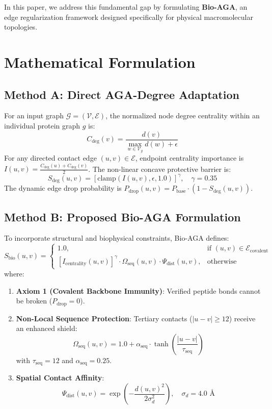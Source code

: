 \documentclass[10pt,journal,compsoc]{IEEEtran}
\begin{document}
In this paper, we address this fundamental gap by formulating \textbf{Bio-AGA}, an edge regularization framework designed specifically for physical macromolecular topologies.

\section{Mathematical Formulation}

\subsection{Method A: Direct AGA-Degree Adaptation}
For an input graph $\mathcal{G} = (\mathcal{V}, \mathcal{E})$, the normalized node degree centrality within an individual protein graph $g$ is:
\begin{equation}
C_{\text{deg}}(v) = \frac{d(v)}{\max_{w \in \mathcal{V}_g} d(w) + \epsilon}
\end{equation}
For any directed contact edge $(u, v) \in \mathcal{E}$, endpoint centrality importance is $I(u, v) = \frac{C_{\text{deg}}(u) + C_{\text{deg}}(v)}{2}$. The non-linear concave protective barrier is:
\begin{equation}
S_{\text{deg}}(u, v) = \left[ \text{clamp}(I(u, v), \epsilon, 1.0) \right]^\gamma, \quad \gamma = 0.35
\end{equation}
The dynamic edge drop probability is $P_{\text{drop}}(u, v) = P_{\text{base}} \cdot (1 - S_{\text{deg}}(u, v))$.

\subsection{Method B: Proposed Bio-AGA Formulation}
To incorporate structural and biophysical constraints, Bio-AGA defines:
\begin{equation}
S_{\text{bio}}(u, v) = \begin{cases}
1.0, & \text{if } (u, v) \in \mathcal{E}_{\text{covalent}} \\
\left[ I_{\text{centrality}}(u, v) \right]^\gamma \cdot \Omega_{\text{seq}}(u, v) \cdot \Psi_{\text{dist}}(u, v), & \text{otherwise}
\end{cases}
\end{equation}
where:
\begin{enumerate}
\item \textbf{Axiom 1 (Covalent Backbone Immunity)}: Verified peptide bonds cannot be broken ($P_{\text{drop}} = 0$).
\item \textbf{Non-Local Sequence Protection}: Tertiary contacts ($|u - v| \ge 12$) receive an enhanced shield:
\begin{equation}
\Omega_{\text{seq}}(u, v) = 1.0 + \alpha_{\text{seq}} \cdot \tanh\left(\frac{|u - v|}{\tau_{\text{seq}}}\right)
\end{equation}
with $\tau_{\text{seq}} = 12$ and $\alpha_{\text{seq}} = 0.25$.
\item \textbf{Spatial Contact Affinity}:
\begin{equation}
\Psi_{\text{dist}}(u, v) = \exp\left(-\frac{d(u, v)^2}{2\sigma_d^2}\right), \quad \sigma_d = 4.0\text{ \AA}
\end{equation}
\end{enumerate}
\end{document}
